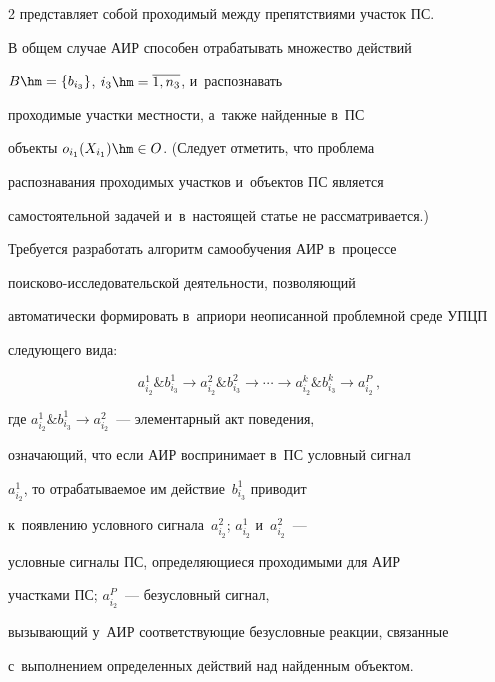 \begin{multicols}{2}
пред\-став\-ля\-ет собой проходимый меж\-ду препятствиями участок ПС.


  


  В общем случае АИР способен отрабатывать множество действий 


  $B\hm= \{ b_{i_3}\}$, $i_3\hm= \overline{1,n_3}$, и~распознавать 


проходимые участ\-ки мест\-ности, а~также найденные в~ПС


объекты $o_{i_1}(X_{i_1})\hm\in O$. (Следует отметить, что проб\-ле\-ма 


распознавания проходимых участков и~объектов ПС является 


самостоятельной задачей и~в~на\-сто\-ящей статье не рас\-смат\-ри\-ва\-ется.)


  


  Требуется разработать алгоритм самообучения АИР в~процессе  


по\-иско\-во-ис\-сле\-до\-ва\-тель\-ской деятельности, поз\-во\-ля\-ющий 


автоматически формировать в~априори неописанной проб\-лем\-ной среде УПЦП 


сле\-ду\-юще\-го вида: 


  \begin{equation}


  a^1_{i_2} \& b^1_{i_3} \to a^2_{i_2} \& b^2_{i_3} \to\cdots\to a^k_{i_2} 


  \& b^k_{i_3} \to a^P_{i_2}\,,


  \label{e1-kh}


  \end{equation}


где $a^1_{i_2}\& b^1_{i_3} \to a^2_{i_2}$~--- элементарный акт поведения, 


озна\-ча\-ющий, что если АИР воспринимает в~ПС условный сигнал 


$a^1_{i_2}$, то отрабатываемое им действие~$b^1_{i_3}$ приводит 


к~появлению условного сигнала~$a^2_{i_2}$; $a^1_{i_2}$ и~$a^2_{i_2}$~--- 


условные сигналы ПС, определяющиеся проходимыми для АИР 


участками ПС; $a^P_{i_2}$~--- безуслов\-ный сигнал, 


вызывающий у~АИР соответствующие безусловные реакции, связанные 


с~выполнением определенных действий над найденным объектом. 






\end{multicols}
